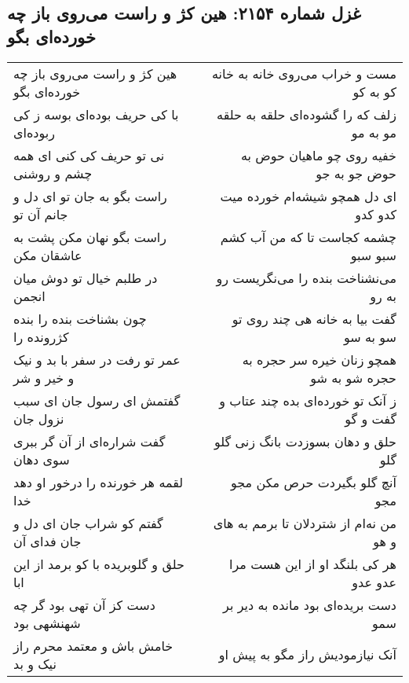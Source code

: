 \begin{center}
\section*{غزل شماره ۲۱۵۴: هین کژ و راست می‌روی باز چه خورده‌ای بگو}
\label{sec:2154}
\begin{longtable}{l p{0.5cm} r}
هین کژ و راست می‌روی باز چه خورده‌ای بگو
&&
مست و خراب می‌روی خانه به خانه کو به کو
\\
با کی حریف بوده‌ای بوسه ز کی ربوده‌ای
&&
زلف که را گشوده‌ای حلقه به حلقه مو به مو
\\
نی تو حریف کی کنی ای همه چشم و روشنی
&&
خفیه روی چو ماهیان حوض به حوض جو به جو
\\
راست بگو به جان تو ای دل و جانم آن تو
&&
ای دل همچو شیشه‌ام خورده میت کدو کدو
\\
راست بگو نهان مکن پشت به عاشقان مکن
&&
چشمه کجاست تا که من آب کشم سبو سبو
\\
در طلبم خیال تو دوش میان انجمن
&&
می‌نشناخت بنده را می‌نگریست رو به رو
\\
چون بشناخت بنده را بنده کژرونده را
&&
گفت بیا به خانه هی چند روی تو سو به سو
\\
عمر تو رفت در سفر با بد و نیک و خیر و شر
&&
همچو زنان خیره سر حجره به حجره شو به شو
\\
گفتمش ای رسول جان ای سبب نزول جان
&&
ز آنک تو خورده‌ای بده چند عتاب و گفت و گو
\\
گفت شراره‌ای از آن گر ببری سوی دهان
&&
حلق و دهان بسوزدت بانگ زنی گلو گلو
\\
لقمه هر خورنده را درخور او دهد خدا
&&
آنچ گلو بگیردت حرص مکن مجو مجو
\\
گفتم کو شراب جان ای دل و جان فدای آن
&&
من نه‌ام از شتردلان تا برمم به های و هو
\\
حلق و گلوبریده با کو برمد از این ابا
&&
هر کی بلنگد او از این هست مرا عدو عدو
\\
دست کز آن تهی بود گر چه شهنشهی بود
&&
دست بریده‌ای بود مانده به دیر بر سمو
\\
خامش باش و معتمد محرم راز نیک و بد
&&
آنک نیازمودیش راز مگو به پیش او
\\
\end{longtable}
\end{center}
